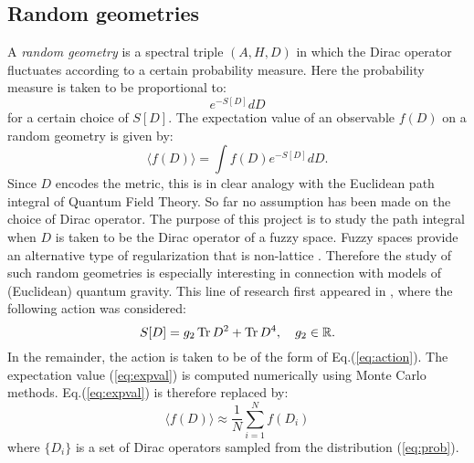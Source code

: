 \subsection{Random geometries} \label{sec:rand}
A \emph{random geometry} is a spectral triple $(A, H, D)$ in which the Dirac operator fluctuates according to a certain probability measure. Here the probability measure is taken to be proportional to:
\begin{equation} \label{eq:prob}
e^{-S[D]} d D
\end{equation}
for a certain choice of $S[D]$. The expectation value of an observable $f(D)$ on a random geometry is given by:
\begin{equation} \label{eq:expval}
\langle f(D) \rangle = \int f(D) e^{-S[D]} d D.
\end{equation}
Since $D$ encodes the metric, this is in clear analogy with the Euclidean path integral of Quantum Field Theory. \newline
So far no assumption has been made on the choice of Dirac operator. The purpose of this project is to study the path integral when $D$ is taken to be the Dirac operator of a fuzzy space.\newline
Fuzzy spaces provide an alternative type of regularization that is non-lattice \cite{barrettglaser}. Therefore the study of such random geometries is especially interesting in connection with models of (Euclidean) quantum gravity. \newline
This line of research first appeared in \cite{barrettglaser}, where the following action was considered:
\begin{equation}\label{eq:action}
S[D] = g_2 \operatorname{Tr} D^2 + \operatorname{Tr} D^4, \quad g_2 \in \mathbb{R}.
\end{equation}
In the remainder, the action is taken to be of the form of Eq.(\ref{eq:action}).\newline
The expectation value (\ref{eq:expval}) is computed numerically using Monte Carlo methods. Eq.(\ref{eq:expval}) is therefore replaced by:
\begin{equation} \label{eq:expval_mc}
\langle f(D) \rangle \approx  \frac{1}{N}\sum_{i=1}^N f(D_i)
\end{equation}
where $\{D_i\}$ is a set of Dirac operators sampled from the distribution (\ref{eq:prob}).


